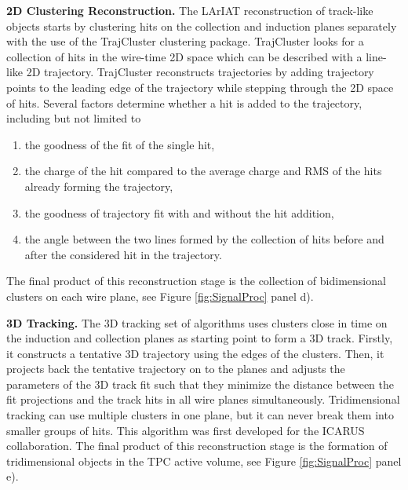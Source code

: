 \textbf{2D Clustering Reconstruction.} 
The LArIAT reconstruction of track-like objects starts by clustering hits on the collection and induction planes separately with the use of the TrajCluster clustering package\cite{Baller2016}. 
TrajCluster looks for a collection of hits in the wire-time 2D space which can be described with a line-like 2D trajectory. TrajCluster reconstructs trajectories by adding trajectory points to the leading edge of the trajectory while stepping through the 2D space of hits. Several factors determine whether a hit is added to the trajectory, including but not limited to
\begin{enumerate}
\item the goodness of the fit of the single hit,
\item the charge of the hit compared to the average charge and RMS of the hits already forming the trajectory,
\item the goodness of trajectory fit with and without the hit addition,
\item the angle between the two lines formed by the collection of hits before and after the considered hit in the trajectory.
\end{enumerate}
The final product of this reconstruction stage is the collection of bidimensional clusters on each wire plane, see Figure \ref{fig:SignalProc} panel d).

\textbf{3D Tracking.} The 3D tracking set of algorithms uses clusters close in time on the induction and collection planes as starting point to form a 3D track. Firstly, it constructs a tentative 3D trajectory using the edges of the clusters. Then, it  projects back the tentative trajectory on to the planes and adjusts the parameters of the 3D track fit such that they minimize the distance between the fit projections and the track hits in all wire planes simultaneously.  Tridimensional tracking can use multiple clusters in one plane, but it can never break them into smaller groups of hits. This algorithm was first developed for the ICARUS collaboration\cite{Antonello2013}. The final product of this reconstruction stage is the formation of  tridimensional objects in the TPC active volume, see Figure \ref{fig:SignalProc} panel e).\\

